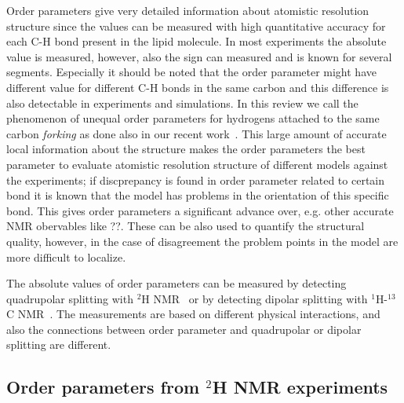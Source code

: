 \documentclass[aps,prl,superscriptaddress,twocolumn]{revtex4}
\begin{document}
Order parameters give very detailed information about atomistic resolution structure since the values can be
measured with high quantitative accuracy for each C-H bond present in the lipid molecule. 
In most experiments the absolute value is measured, however, also the sign can measured and is known
for several segments.
Especially it should
be noted that the order parameter might have different value for different C-H bonds in the same carbon and
this difference is also detectable in experiments and simulations. In this review we call the phenomenon of 
unequal order parameters for hydrogens attached to the same carbon {\it forking} as done also in our recent work~\cite{botan15}.
This large amount of accurate local information about the structure makes the order parameters 
the best parameter to evaluate atomistic resolution structure of different models against the experiments;
if discprepancy is found in order parameter related to certain bond it is known that the model has problems
in the orientation of this specific bond. This gives order parameters a significant advance over, e.g. other
accurate NMR obervables like ??. These can be also used to quantify the structural quality, however, in the
case of disagreement the problem points in the model are more difficult to localize.





The absolute values of order parameters can be measured by detecting quadrupolar splitting with $^2$H NMR~\cite{seelig77c} or by detecting dipolar 
splitting with $^1$H-$^{13}$C NMR~\cite{hong95a,gross97,dvinskikh05a,ferreira13}. The measurements are based on
different physical interactions, and also the connections between order parameter and quadrupolar or dipolar splitting
are different. 

\subsection{Order parameters from $^2$H NMR experiments}
\end{document}
